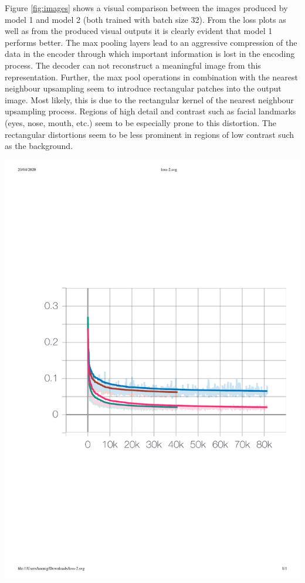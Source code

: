 \documentclass{article}
\newenvironment{Figure}
  {\par\medskip\noindent\minipage{\linewidth}}
  {\endminipage\par\medskip}
\begin{document}
\begin{multicols}{2}
Figure \ref{fig:images} shows a visual comparison between the images produced by model 1 and model 2 (both trained with batch size 32). From the loss plots as well as from the produced visual outputs it is clearly evident that model 1 performs better. The max pooling layers lead to an aggressive compression of the data in the encoder through which important information is lost in the encoding process. The decoder can not reconstruct a meaningful image from this representation. Further, the max pool operations in combination with the nearest neighbour upsampling seem to introduce rectangular patches into the output image. Most likely, this is due to the rectangular kernel of the nearest neighbour upsampling process. Regions of high detail and contrast such as facial landmarks (eyes, nose, mouth, etc.) seem to be especially prone to this distortion. The rectangular distortions seem to be less prominent in regions of low contrast such as the background.

\begin{Figure}
	\centering 
	\includegraphics[width=\linewidth]{figures/train_1_2.pdf}
	\label{fig:train}
\end{Figure}


\end{multicols}
\end{document}
